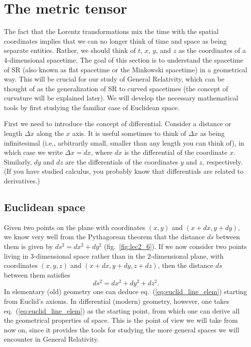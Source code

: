 \documentclass[11pt, a4paper,oneside,openright]{book}
\numberwithin{equation}{section}
\begin{document}
\section{The metric tensor}

The fact that the Lorentz transformations mix the time with the spatial coordinates implies that we can no longer think of time and space as being separate entities. Rather, we should think of $t$, $x$, $y$, and $z$ as the coordinates of a 4-dimensional spacetime. The goal of this section is to understand the spacetime of SR (also known as flat spacetime or the Minkowski spacetime) in a geometrical way. This will be crucial for our study of General Relativity, which can be thought of as the generalization of SR to curved spacetimes (the concept of curvature will be explained later). We will develop the necessary mathematical tools by first studying the familiar case of Euclidean space.

First we need to introduce the concept of differential. Consider a distance or length $\Delta x$ along the $x$ axis. It is useful sometimes to think of $\Delta x$ as being infinitesimal (i.e., arbitrarily small, smaller than any length you can think of), in which case we write $\Delta x=dx$, where $dx$ is the differential of the coordinate $x$. Similarly, $dy$ and $dz$ are the differentials of the coordinates $y$ and $z$, respectively. (If you have studied calculus, you probably know that differentials are related to derivatives.)

\subsection{Euclidean space}

Given two points on the plane with coordinates $(x,y)$ and $(x+dx,y+dy)$, we know very well from the Pythagorean theorem that the distance $ds$ between them is given by $ds^2=dx^2+dy^2$ (fig.\ \ref{fig:lec2_6}). If we now consider two points living in 3-dimensional space rather than in the 2-dimensional plane, with coordinates $(x,y,z)$ and $(x+dx,y+dy,z+dz)$, then the distance $ds$ between them satisfies
\begin{equation} \label{eq:euclid_line_elem}
ds^2=dx^2+dy^2+dz^2.
\end{equation}
In elementary (old) geometry one can deduce eq.\ (\ref{eq:euclid_line_elem}) starting from Euclid's axioms. In differential (modern) geometry, however, one takes eq.\ (\ref{eq:euclid_line_elem}) as the starting point, from which one can derive all the geometrical properties of space. This is the point of view we will take from now on, since it provides the tools for studying the more general spaces we will encounter in General Relativity.
\end{document}
